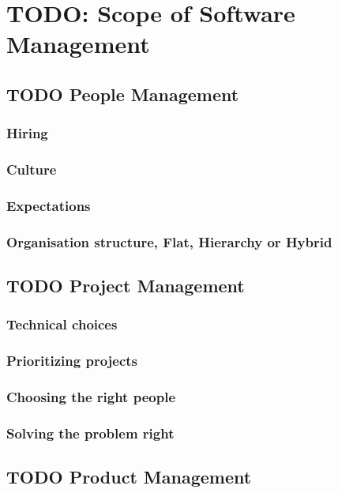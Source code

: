 \documentclass[10pt,conference]{IEEEtran}
\begin{document}
\section*{TODO: Scope of Software Management}

\subsection*{TODO People Management}

\subsubsection*{Hiring}
\subsubsection*{Culture}
\subsubsection*{Expectations}
\subsubsection*{Organisation structure, Flat, Hierarchy or Hybrid}

\subsection*{TODO Project Management}

\subsubsection*{Technical choices}
\subsubsection*{Prioritizing projects}
\subsubsection*{Choosing the right people}
\subsubsection*{Solving the problem right}

\subsection*{TODO Product Management}
\end{document}
